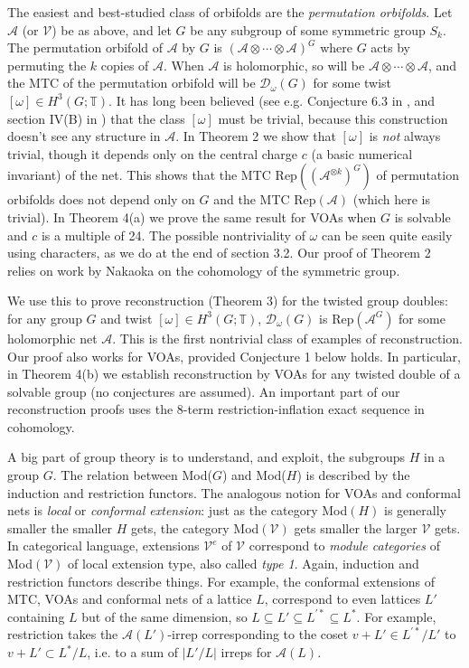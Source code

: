 \documentclass[12pt]{article}
\numberwithin{equation}{section}
\def\cA            {{\mathcal{A}}}
\def\cD            {{\mathcal{D}}}
\def\cV            {{\mathcal{V}}}
\def\bbT           {\mathbb{T}}
\begin{document}
The easiest and best-studied class of orbifolds are
the \textit{permutation orbifolds}.
Let $\cA$ (or $\cV$) be as above, and let $G$ be any subgroup of some symmetric group $S_k$. The permutation orbifold of $\cA$ by $G$ is $(\cA\otimes\cdots\otimes\cA)^G$ where $G$ acts by permuting the $k$ copies of $\cA$. When $\cA$ is holomorphic, so will be $\cA\otimes\cdots\otimes\cA$, and  the  MTC of the permutation orbifold will be  $\cD_\omega(G)$ for some twist $[\omega]\in H^3(G;\bbT)$. It has long been believed (see e.g. Conjecture 6.3 in \cite{Mug1}, and section IV(B) in \cite{Dav2}) that the class $[\omega]$ must be trivial, because this construction doesn't see any structure in $\cA$. In Theorem 2 we show that $[\omega]$ is \textit{not} always trivial, though it depends only on the central charge $c$ (a basic numerical invariant) of the net. This shows that the MTC Rep$((\cA^{\otimes k})^G)$ of permutation orbifolds  does not depend only on $G$ and the MTC Rep$(\cA)$ (which here is trivial). In Theorem 4(a) we prove the same result  for VOAs when $G$ is solvable and $c$ is a multiple of 24. The possible nontriviality of $\omega$ can be seen quite easily using characters, as we do at the end of section 3.2. Our proof of Theorem 2 relies on work by Nakaoka \cite{Nak} on the cohomology of the symmetric group.

We use this to prove reconstruction
 (Theorem 3)  for the twisted group doubles: for any group $G$ and twist $[\omega]\in H^3(G;\bbT)$, $\cD_\omega(G)$ is Rep$(\cA^G)$ for some holomorphic net $\cA$. This is the first nontrivial class of examples of reconstruction.  Our proof also works for VOAs, provided Conjecture 1 below holds. In particular, in Theorem 4(b) we establish reconstruction by VOAs for any twisted double of a solvable group (no conjectures are assumed). An important part of our reconstruction proofs uses the 8-term restriction-inflation exact sequence in cohomology.



A big part of group theory is to understand, and exploit, the subgroups $H$ in a group $G$. The relation between Mod($G$) and Mod($H$) is described by the induction and restriction functors. The analogous notion for VOAs and conformal nets is \textit{local} or \textit{conformal extension}: just as the category
Mod$(H)$ is generally smaller the smaller $H$ gets, the category Mod$(\cV)$ gets smaller the larger
$\cV$ gets. In  categorical language, extensions  $\cV^e$ of $\cV$ correspond to \textit{module categories}
of Mod$(\cV)$ of local extension type, also called \textit{type 1}. Again, induction and restriction functors describe things. For example, the conformal extensions of MTC, VOAs and conformal nets of a lattice $L$, correspond to 
even lattices $L'$ containing $L$ but of the same dimension, so $L\subseteq L'\subseteq L^{\prime *}\subseteq L^*$. For example, restriction takes the $\cA(L')$-irrep corresponding to the coset
$v+L'\in L^{\prime*}/L'$ to $v+L'\subset L^*/L$, i.e. to a sum of $|L'/L|$ irreps for $\cA(L)$. 
\end{document}
